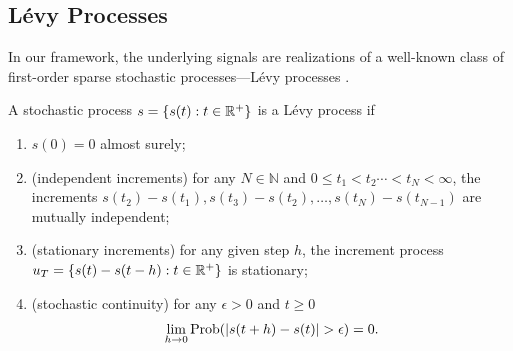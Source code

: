 \documentclass[journal]{IEEEtran}
\begin{document}
\subsection{L\'{e}vy Processes}
In our framework, the underlying signals are realizations of a well-known class of first-order sparse stochastic processes---L\'{e}vy processes \cite{ken1999levy,unser2014ssp}.

\begin{definition}[L\'{e}vy process]
A stochastic process $s = \{s(t) : t \in \mathbb{R}^{+}\}$ is a L\'{e}vy process if
\begin{enumerate}
    \item $s(0) = 0$ almost surely;
    \item (independent increments) for any $N \in \mathbb{N}$ and $0 \leq t_1 < t_2 \cdots < t_N < \infty$, the increments $s(t_2)-s(t_1), s(t_3)-s(t_2), \ldots, s(t_N)-s(t_{N-1})$ are mutually independent;
    \item (stationary increments) for any given step $h$, the increment process $u_T = \{s(t) - s(t-h) : t \in \mathbb{R}^{+}\}$ is stationary;
    \item (stochastic continuity) for any $\epsilon > 0$ and $t \geq 0$
    \begin{equation*}
        \lim_{h \rightarrow 0} \textup{Prob}(|s(t+h)-s(t)| > \epsilon) = 0.
    \end{equation*}
\end{enumerate}
\end{definition}
\end{document}
